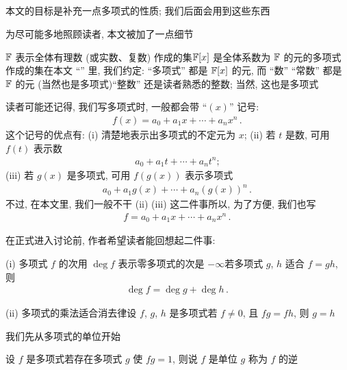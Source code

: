 \subsection*{\SomePropertiesOfPolynomials}
\markright{\SomePropertiesOfPolynomials}

本文的目标是补充一点多项式的性质; 我们后面会用到这些东西\period

为尽可能多地照顾读者, 本文被加了一点细节\period

$\mathbb{F}$ 表示全体有理数 (或实数、复数) 作成的集\period $\mathbb{F}[x]$ 是全体系数为 $\mathbb{F}$ 的元的多项式作成的集\period 在本文 ``\SomePropertiesOfPolynomials '' 里, 我们约定: ``多项式'' 都是 $\mathbb{F}[x]$ 的元, 而 ``数'' ``常数'' 都是 $\mathbb{F}$ 的元 (当然也是多项式)\period ``整数'' 还是读者熟悉的整数; 当然, 这也是多项式\period

读者可能还记得, 我们写多项式时, 一般都会带 ``$(x)$'' 记号:
\begin{align*}
    f(x) = a_0 + a_1 x + \cdots + a_n x^n \period
\end{align*}
这个记号的优点有: (i) 清楚地表示出多项式的不定元为 $x$; (ii) 若 $t$ 是数, 可用 $f(t)$ 表示数
\begin{align*}
    a_0 + a_1 t + \cdots + a_n t^n;
\end{align*}
(iii) 若 $g(x)$ 是多项式, 可用 $f(g(x))$ 表示多项式
\begin{align*}
    a_0 + a_1 g(x) + \cdots + a_n (g(x))^n \period
\end{align*}
不过, 在本文里, 我们一般不干 (ii) (iii) 这二件事\period 所以, 为了方便, 我们也写
\begin{align*}
    f = a_0 + a_1 x + \cdots + a_n x^n \period
\end{align*}

在正式进入讨论前, 作者希望读者能回想起二件事:

(i) 多项式 $f$ 的次用 $\deg f$ 表示\period 零多项式的次是 $-\infty$\period 若多项式 $g$, $h$ 适合 $f = gh$, 则
\begin{align*}
    \deg f = \deg g + \deg h \period
\end{align*}

(ii) 多项式的乘法适合消去律\period 设 $f$, $g$, $h$ 是多项式\period 若 $f \neq 0$, 且 $fg = fh$, 则 $g = h$\period

我们先从多项式的单位开始\period

\begin{definition}
    设 $f$ 是多项式\period 若存在多项式 $g$ 使 $fg = 1$, 则说 $f$ 是单位 \period $g$ 称为 $f$ 的逆 \period
\end{definition}

